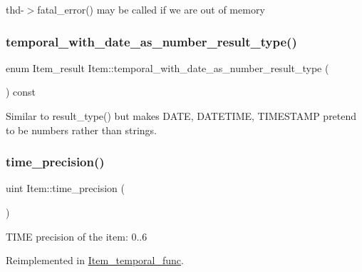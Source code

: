 thd-\/$>$fatal\+\_\+error() may be called if we are out of memory \mbox{\label{classItem_af87ae536f54acffbc047f65e7c14d0b4}} 
\subsubsection{\texorpdfstring{temporal\+\_\+with\+\_\+date\+\_\+as\+\_\+number\+\_\+result\+\_\+type()}{temporal\_with\_date\_as\_number\_result\_type()}}
{\footnotesize\ttfamily enum Item\+\_\+result Item\+::temporal\+\_\+with\+\_\+date\+\_\+as\+\_\+number\+\_\+result\+\_\+type (\begin{DoxyParamCaption}{ }\end{DoxyParamCaption}) const\hspace{0.3cm}{\ttfamily [inline]}}

Similar to result\+\_\+type() but makes D\+A\+TE, D\+A\+T\+E\+T\+I\+ME, T\+I\+M\+E\+S\+T\+A\+MP pretend to be numbers rather than strings. \mbox{\label{classItem_a7b3cc55ea7e3a429a6e8f0fbbba6e4ff}} 
\subsubsection{\texorpdfstring{time\+\_\+precision()}{time\_precision()}}
{\footnotesize\ttfamily uint Item\+::time\+\_\+precision (\begin{DoxyParamCaption}{ }\end{DoxyParamCaption})\hspace{0.3cm}{\ttfamily [virtual]}}

T\+I\+ME precision of the item\+: 0..6 

Reimplemented in \mbox{\hyperlink{classItem__temporal__func_a78c81ac3504e8cc63f3743bee366f3f2}{Item\+\_\+temporal\+\_\+func}}.

\mbox{\label{classItem_a54c52eb8a27c390d227b0aa547829e1b}} 

